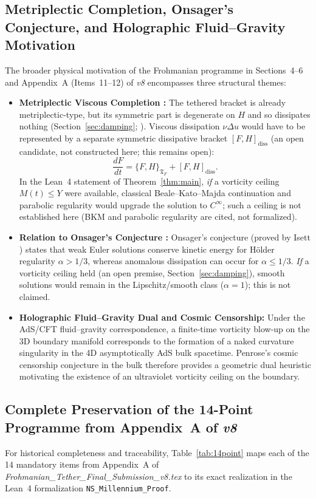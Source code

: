 \documentclass[11pt,a4paper]{article}
\theoremstyle{plain}
\theoremstyle{definition}
\theoremstyle{remark}
\newcommand{\Tf}{\mathfrak{T}_F}
\begin{document}
\subsection{Metriplectic Completion, Onsager's Conjecture, and Holographic Fluid--Gravity Motivation}
The broader physical motivation of the Frohmanian programme in Sections~4--6 and Appendix~A (Items~11--12) of \emph{v8} encompasses three structural themes:
\begin{itemize}
\item \textbf{Metriplectic Viscous Completion \cite{Morrison1986}:} The tethered bracket is already metriplectic-type, but its symmetric part is degenerate on $H$ and so dissipates nothing (Section~\ref{sec:damping}; ). Viscous dissipation $\nu\Delta u$ would have to be represented by a separate symmetric dissipative bracket $[F,H]_{\mathrm{diss}}$ (an open candidate, not constructed here; this remains open):
\[
\frac{dF}{dt} = \{F,H\}_{\Tf} + [F,H]_{\mathrm{diss}}.
\]
In the Lean~4 statement of Theorem~\ref{thm:main}, \emph{if} a vorticity ceiling $M(t)\le Y$ were available, classical Beale--Kato--Majda continuation and parabolic regularity would upgrade the solution to $C^\infty$; such a ceiling is not established here (BKM and parabolic regularity are cited, not formalized).
\item \textbf{Relation to Onsager's Conjecture \cite{Isett2018}:} Onsager's conjecture (proved by Isett \cite{Isett2018}) states that weak Euler solutions conserve kinetic energy for Hölder regularity $\alpha>1/3$, whereas anomalous dissipation can occur for $\alpha\le1/3$. \emph{If} a vorticity ceiling held (an open premise, Section~\ref{sec:damping}), smooth solutions would remain in the Lipschitz/smooth class ($\alpha=1$); this is not claimed.
\item \textbf{Holographic Fluid--Gravity Dual and Cosmic Censorship:} Under the AdS/CFT fluid--gravity correspondence, a finite-time vorticity blow-up on the 3D boundary manifold corresponds to the formation of a naked curvature singularity in the 4D asymptotically AdS bulk spacetime. Penrose's cosmic censorship conjecture in the bulk therefore provides a geometric dual heuristic motivating the existence of an ultraviolet vorticity ceiling on the boundary.
\end{itemize}

\subsection{Complete Preservation of the 14-Point Programme from Appendix~A of \emph{v8}}
For historical completeness and traceability, Table~\ref{tab:14point} maps each of the 14 mandatory items from Appendix~A of \emph{Frohmanian\_Tether\_Final\_Submission\_v8.tex} to its exact realization in the Lean~4 formalization \texttt{NS\_Millennium\_Proof}.
\end{document}
